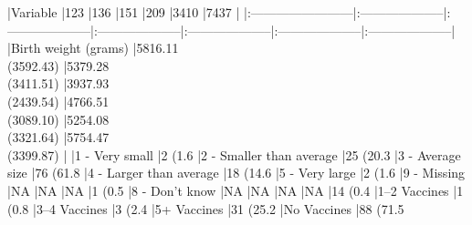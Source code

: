 |Variable                 |123                  |136                  |151                  |209                  |3410                 |7437                 |
|:------------------------|:--------------------|:--------------------|:--------------------|:--------------------|:--------------------|:--------------------|
|Birth weight (grams)     |5816.11 \\ (3592.43) |5379.28 \\ (3411.51) |3937.93 \\ (2439.54) |4766.51 \\ (3089.10) |5254.08 \\ (3321.64) |5754.47 \\ (3399.87) |
|1 - Very small           |2 (1.6%
|2 - Smaller than average |25 (20.3%
|3 - Average size         |76 (61.8%
|4 - Larger than average  |18 (14.6%
|5 - Very large           |2 (1.6%
|9 - Missing              |NA                   |NA                   |NA                   |1 (0.5%
|8 - Don’t know           |NA                   |NA                   |NA                   |NA                   |14 (0.4%
|1–2 Vaccines             |1 (0.8%
|3–4 Vaccines             |3 (2.4%
|5+ Vaccines              |31 (25.2%
|No Vaccines              |88 (71.5%


